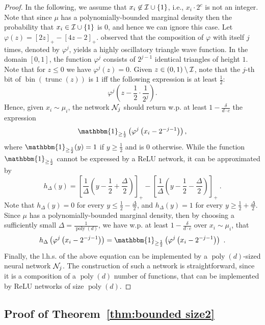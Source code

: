 \documentclass[11pt]{article}
\newcommand{\onefunc}{\mathbbm{1}}
\newcommand{\ci}{{\cal I}}
\newcommand{\cn}{{\cal N}}
\DeclareMathOperator{\poly}{poly}
\DeclareMathOperator{\bin}{bin}
\DeclareMathOperator{\trunc}{trunc}
\begin{document}
\begin{proof}
	In the following, we assume that $x_i \not \in \ci \cup \{1\}$, i.e., $x_i \cdot 2^c$ is not an integer. Note that since $\mu$ has a polynomially-bounded marginal density then the probability that $x_i \in \ci \cup \{1\}$ is $0$, and hence we can ignore this case.
	Let $\varphi(z) = [2z]_+ - [4z-2]_+$. \cite{telgarsky2016benefits} observed that the composition of $\varphi$ with itself $j$ times, denoted by $\varphi^j$, yields a highly oscillatory triangle wave function. In the domain $[0,1]$, the function $\varphi^j$ consists of $2^{j-1}$ identical triangles of height $1$. 
	Note that for $z \leq 0$ we have $\varphi^j(z)=0$.
	Given $z \in (0,1) \setminus \ci$, note that the $j$-th bit of $\bin(\trunc(z))$ is $1$ iff the following expression is at least $\frac{1}{2}$:
	\[
	\varphi^j \left(z - \frac{1}{2} \cdot \frac{1}{2^j}\right).
	\]
	Hence, given $x_i \sim \mu_i$, the network $\cn_j$ should return w.p. at least $1-\frac{\delta}{d \cdot c}$ the expression 
	\[
	\onefunc_{\geq \frac{1}{2}}\left(\varphi^j \left(x_i - 2^{-j-1}\right)\right),
	\]
	where $\onefunc_{\geq \frac{1}{2}}(y)=1$ if $y \geq \frac{1}{2}$ and is $0$ otherwise. While the function $\onefunc_{\geq \frac{1}{2}}$ cannot be expressed by a ReLU network, it can be approximated by
	\[
	h_\Delta(y)
	= \left[\frac{1}{\Delta}\left(y-\frac{1}{2}+\frac{\Delta}{2}\right)\right]_+ - \left[\frac{1}{\Delta}\left(y-\frac{1}{2}-\frac{\Delta}{2}\right)\right]_+~.
	\]
	Note that $h_\Delta(y)=0$ for every $y \leq \frac{1}{2}-\frac{\Delta}{2}$, and $h_\Delta(y)=1$ for every $y \geq \frac{1}{2}+\frac{\Delta}{2}$. Since $\mu$ has a polynomially-bounded marginal density, then by choosing a sufficiently small $\Delta=\frac{1}{\poly(d)}$, we have w.p. at least $1-\frac{\delta}{d \cdot c}$ over $x_i \sim \mu_i$, that 
	\[
	h_\Delta\left(\varphi^j \left(x_i - 2^{-j-1}\right)\right) =
	\onefunc_{\geq \frac{1}{2}}\left(\varphi^j \left(x_i -2^{-j-1} \right)\right)~.
	\]
	Finally, the l.h.s. of the above equation can be implemented by a $\poly(d)$-sized neural network $\cn_j$. The construction of such a network is straightforward, since it is a composition of a $\poly(d)$ number of functions, that can be implemented by ReLU networks of size $\poly(d)$.
\end{proof}

\subsection{Proof of Theorem~\ref{thm:bounded size2}}
\label{app:proof of theorem bounded size2}
\end{document}
